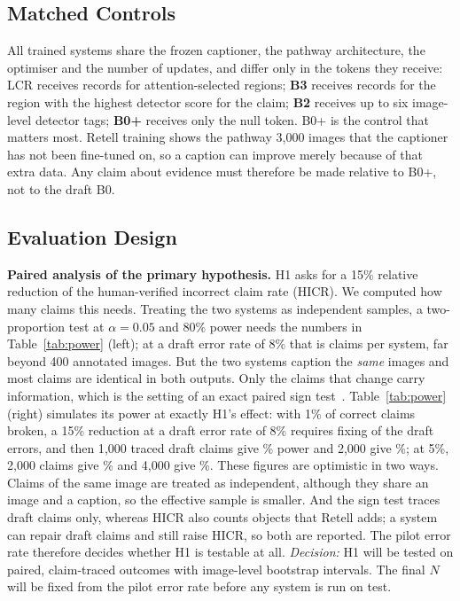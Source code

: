 \subsection{Matched Controls}
All trained systems share the frozen captioner, the pathway architecture, the optimiser and the number of updates, and differ only in the tokens they receive: LCR receives records for attention-selected regions; \textbf{B3} receives records for the region with the highest detector score for the claim; \textbf{B2} receives up to six image-level detector tags; \textbf{B0+} receives only the null token. B0+ is the control that matters most. Retell training shows the pathway 3{,}000 images that the captioner has not been fine-tuned on, so a caption can improve merely because of that extra data. Any claim about evidence must therefore be made relative to B0+, not to the draft B0.

\subsection{Evaluation Design}
\label{sec:design-eval}
\textbf{Paired analysis of the primary hypothesis.} H1 asks for a 15\% relative reduction of the human-verified incorrect claim rate (HICR). We computed how many claims this needs. Treating the two systems as independent samples, a two-proportion test at $\alpha=0.05$ and 80\% power needs the numbers in Table~\ref{tab:power} (left); at a draft error rate of 8\% that is \HPowerIndepEight{} claims per system, far beyond 400 annotated images. But the two systems caption the \emph{same} images and most claims are identical in both outputs. Only the claims that change carry information, which is the setting of an exact paired sign test~\cite{koehn2004statistical}. Table~\ref{tab:power} (right) simulates its power at exactly H1's effect: with 1\% of correct claims broken, a 15\% reduction at a draft error rate of 8\% requires fixing \HPowerFixEight{} of the draft errors, and then 1{,}000 traced draft claims give \HPowerEightOneK\% power and 2{,}000 give \HPowerEightTwoK\%; at 5\%, 2{,}000 claims give \HPowerFiveTwoK\% and 4{,}000 give \HPowerFiveFourK\%. These figures are optimistic in two ways. Claims of the same image are treated as independent, although they share an image and a caption, so the effective sample is smaller. And the sign test traces draft claims only, whereas HICR also counts objects that Retell adds; a system can repair draft claims and still raise HICR, so both are reported. The pilot error rate therefore decides whether H1 is testable at all. \emph{Decision:} H1 will be tested on paired, claim-traced outcomes with image-level bootstrap intervals. The final $N$ will be fixed from the pilot error rate before any system is run on test.

